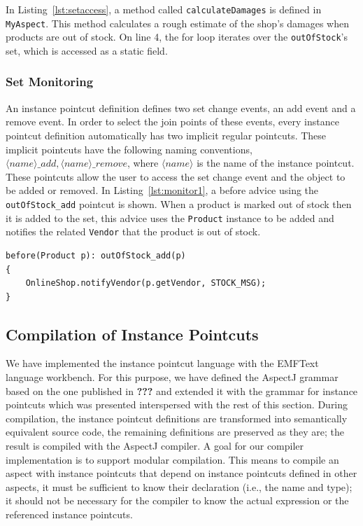 \documentclass{acm_proc_article-sp}
\begin{document}
In Listing~\ref{lst:setaccess},  a method called \texttt{calculateDamages} is defined in \texttt{MyAspect}. This method calculates a rough estimate of the shop's damages when products are out of stock. On line 4, the for loop iterates over the \texttt{outOfStock}'s set, which is accessed as a static field.


\subsubsection{Set Monitoring}
An instance pointcut definition defines two set change events, an add event and a remove event. In order to select the join points of these events, every instance pointcut definition automatically has two implicit regular pointcuts. These implicit pointcuts have the following naming conventions, $\langle name \rangle\_add, \langle name \rangle\_remove$, where $\langle name \rangle$ is the name of the instance pointcut. These pointcuts allow the user to access the set change event and the object to be added or removed. In Listing~\ref{lst:monitor1}, a before advice using the \texttt{outOfStock_add} pointcut is shown. When a product is marked out of stock then it is added to the set, this advice uses the \texttt{Product} instance to be added and notifies the related \texttt{Vendor} that the product is out of stock.

\begin{lstlisting}[float=h!, caption={Set monitoring pointcut used to notify vendors}, label={lst:monitor1}]
before(Product p): outOfStock_add(p)
{
	OnlineShop.notifyVendor(p.getVendor, STOCK_MSG);
}
\end{lstlisting}






\subsection{Compilation of Instance Pointcuts}


We have implemented the instance pointcut language with the EMFText language workbench.
For this purpose, we have defined the AspectJ grammar based on the one published in \textbf{???} and extended it with the grammar for instance pointcuts which was presented interspersed with the rest of this section.
During compilation, the instance pointcut definitions are transformed into semantically equivalent source code, the remaining definitions are preserved as they are; the result is compiled with the AspectJ compiler.
A goal for our compiler implementation is to support modular compilation.
This means to compile an aspect with instance pointcuts that depend on instance pointcuts defined in other aspects, it must be sufficient to know their declaration (i.e., the name and type); it should not be necessary for the compiler to know the actual expression or the referenced instance pointcuts.
\end{document}
